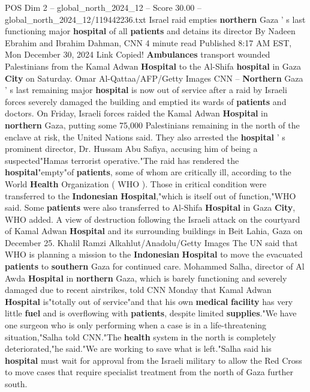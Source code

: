 \begin{textsample}{POS Dim 2 – global\_north\_2024\_12 – Score 30.00 – global\_north\_2024\_12/119442236.txt}  \label{ex:f2_pos_186}
Israel raid empties \textbf{northern} Gaza ' s last functioning major \textbf{hospital} of all \textbf{patients} and detains its director By Nadeen Ebrahim and Ibrahim Dahman, CNN 4 minute read Published 8:17 AM EST, Mon December 30, 2024 Link Copied! \textbf{Ambulances} transport wounded Palestinians from the Kamal Adwan \textbf{Hospital} to the Al-Shifa \textbf{hospital} in Gaza \textbf{City} on Saturday.
Omar Al-Qattaa/AFP/Getty Images CNN -- \textbf{Northern} Gaza ' s last remaining major \textbf{hospital} is now out of service after a raid by Israeli forces severely damaged the building and emptied its wards of \textbf{patients} and doctors.
On Friday, Israeli forces raided the Kamal Adwan \textbf{Hospital} in \textbf{northern} Gaza, putting some 75,000 Palestinians remaining in the north of the enclave at risk, the United Nations said.
They also arrested the \textbf{hospital} ' s prominent director, Dr.
Hussam Abu Safiya, accusing him of being a suspected"Hamas terrorist operative."The raid has rendered the \textbf{hospital}"empty"of \textbf{patients}, some of whom are critically ill, according to the World \textbf{Health} Organization ( WHO ).
Those in critical condition were transferred to the \textbf{Indonesian} \textbf{Hospital},"which is itself out of function,"WHO said.
Some \textbf{patients} were also transferred to Al-Shifa \textbf{Hospital} in Gaza \textbf{City}, WHO added.
A view of destruction following the Israeli attack on the courtyard of Kamal Adwan \textbf{Hospital} and its surrounding buildings in Beit Lahia, Gaza on December 25.
Khalil Ramzi Alkahlut/Anadolu/Getty Images The UN said that WHO is planning a mission to the \textbf{Indonesian} \textbf{Hospital} to move the evacuated \textbf{patients} to \textbf{southern} Gaza for continued care.
Mohammed Salha, director of Al Awda \textbf{Hospital} in \textbf{northern} Gaza, which is barely functioning and severely damaged due to recent airstrikes, told CNN Monday that Kamal Adwan \textbf{Hospital} is"totally out of service"and that his own \textbf{medical} \textbf{facility} has very little \textbf{fuel} and is overflowing with \textbf{patients}, despite limited \textbf{supplies}."We have one surgeon who is only performing when a case is in a life-threatening situation,"Salha told CNN."The \textbf{health} system in the north is completely deteriorated,"he said."We are working to save what is left."Salha said his \textbf{hospital} must wait for approval from the Israeli military to allow the Red Cross to move cases that require specialist treatment from the north of Gaza further south.

\end{textsample}
